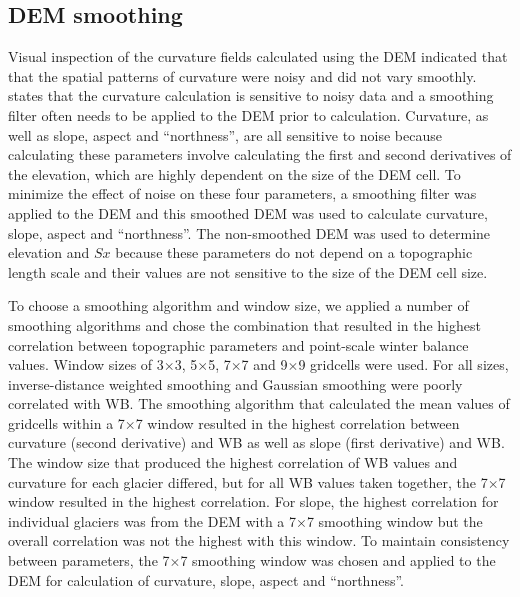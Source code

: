 \documentclass{sfuthesis}
\begin{document}
\subsection{DEM smoothing}

Visual inspection of the curvature fields calculated using the DEM indicated that that the spatial patterns of curvature were noisy and did not vary smoothly. \cite{Olaya2009} states that the curvature calculation is sensitive to noisy data and a smoothing filter often needs to be applied to the DEM prior to calculation. Curvature, as well as slope, aspect and ``northness'', are all sensitive to noise because calculating these parameters involve calculating the first and second derivatives of the elevation, which are highly dependent on the size of the DEM cell. To minimize the effect of noise on these four parameters, a smoothing filter was applied to the DEM and this smoothed DEM was used to calculate curvature, slope, aspect and ``northness''. The non-smoothed DEM was used to determine elevation and $Sx$ because these parameters do not depend on a topographic length scale and their values are not sensitive to the size of the DEM cell size.

To choose a smoothing algorithm and window size, we applied a number of smoothing algorithms and chose the combination that resulted in the highest correlation between topographic parameters and point-scale winter balance values. Window sizes of 3$\times$3, 5$\times$5, 7$\times$7 and 9$\times$9 gridcells were used. For all sizes, inverse-distance weighted smoothing and Gaussian smoothing were poorly correlated with WB. The smoothing algorithm that calculated the mean values of gridcells within a 7$\times$7 window resulted in the highest correlation between curvature (second derivative) and WB as well as slope (first derivative) and WB. The window size that produced the highest correlation of WB values and curvature for each glacier differed, but for all WB values taken together, the 7$\times$7 window resulted in the highest correlation. For slope, the highest correlation for individual glaciers was from the DEM with a 7$\times$7 smoothing window but the overall correlation was not the highest with this window. To maintain consistency between parameters, the 7$\times$7 smoothing window was chosen and applied to the DEM for calculation of curvature, slope, aspect and ``northness''. 
\end{document}
